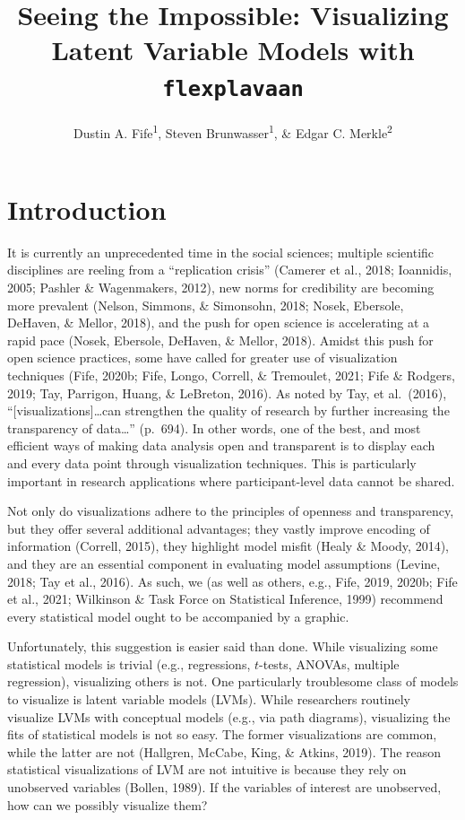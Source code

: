\documentclass[
  english,
  man]{apa6}
\title{Seeing the Impossible: Visualizing Latent Variable Models with \texttt{flexplavaan}}
\author{Dustin A. Fife\textsuperscript{1}, Steven Brunwasser\textsuperscript{1}, \& Edgar C. Merkle\textsuperscript{2}}
\date{}
\affiliation{\vspace{0.5cm}\textsuperscript{1} Rowan University\\\textsuperscript{2} University of Missouri}
\begin{document}
\maketitle

\hypertarget{introduction}{%
\section{Introduction}\label{introduction}}

It is currently an unprecedented time in the social sciences; multiple scientific disciplines are reeling from a ``replication crisis'' (Camerer et al., 2018; Ioannidis, 2005; Pashler \& Wagenmakers, 2012), new norms for credibility are becoming more prevalent (Nelson, Simmons, \& Simonsohn, 2018; Nosek, Ebersole, DeHaven, \& Mellor, 2018), and the push for open science is accelerating at a rapid pace (Nosek, Ebersole, DeHaven, \& Mellor, 2018). Amidst this push for open science practices, some have called for greater use of visualization techniques (Fife, 2020b; Fife, Longo, Correll, \& Tremoulet, 2021; Fife \& Rodgers, 2019; Tay, Parrigon, Huang, \& LeBreton, 2016). As noted by Tay, et al.~(2016), ``{[}visualizations{]}\ldots can strengthen the quality of research by further increasing the transparency of data\ldots{}'' (p.~694). In other words, one of the best, and most efficient ways of making data analysis open and transparent is to display each and every data point through visualization techniques. This is particularly important in research applications where participant-level data cannot be shared.

Not only do visualizations adhere to the principles of openness and transparency, but they offer several additional advantages; they vastly improve encoding of information (Correll, 2015), they highlight model misfit (Healy \& Moody, 2014), and they are an essential component in evaluating model assumptions (Levine, 2018; Tay et al., 2016). As such, we (as well as others, e.g., Fife, 2019, 2020b; Fife et al., 2021; Wilkinson \& Task Force on Statistical Inference, 1999) recommend every statistical model ought to be accompanied by a graphic.

Unfortunately, this suggestion is easier said than done. While visualizing some statistical models is trivial (e.g., regressions, \(t\)-tests, ANOVAs, multiple regression), visualizing others is not. One particularly troublesome class of models to visualize is latent variable models (LVMs). While researchers routinely visualize LVMs with conceptual models (e.g., via path diagrams), visualizing the fits of statistical models is not so easy. The former visualizations are common, while the latter are not (Hallgren, McCabe, King, \& Atkins, 2019). The reason statistical visualizations of LVM are not intuitive is because they rely on unobserved variables (Bollen, 1989). If the variables of interest are unobserved, how can we possibly visualize them?
\end{document}
